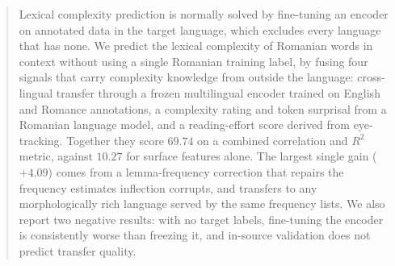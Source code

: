 \author{}



\maketitle
\begin{abstract}
Lexical complexity prediction is normally solved by fine-tuning an
encoder on annotated data in the target language, which excludes every
language that has none. We predict the lexical complexity of Romanian
words in context without using a single Romanian training label, by
fusing four signals that carry complexity knowledge from outside the
language: cross-lingual transfer through a frozen multilingual encoder
trained on English and Romance annotations, a complexity rating and
token surprisal from a Romanian language model, and a reading-effort
score derived from eye-tracking. Together they score $69.74$ on a
combined correlation and $R^2$ metric, against $10.27$ for surface
features alone. The largest single gain
($+4.09$) comes from a lemma-frequency correction that repairs the
frequency estimates inflection corrupts, and transfers to any
morphologically rich language served by the same frequency lists. We
also report two negative results: with no target labels, fine-tuning
the encoder is consistently worse than freezing it, and in-source
validation does not predict transfer quality.
\end{abstract}

